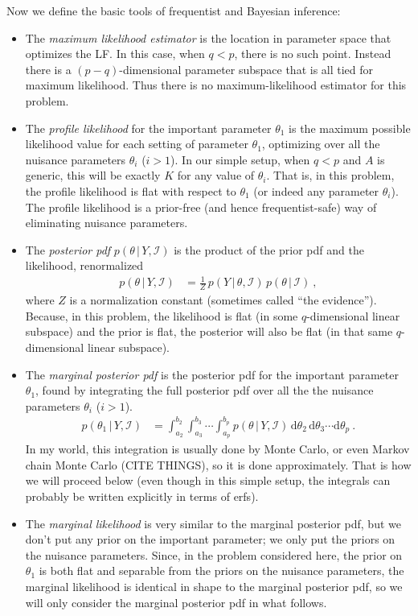 \documentclass[10pt]{article}
\newcommand{\given}{\,|\,}
\newcommand{\dd}{\mathrm{d}}
\begin{document}
Now we define the basic tools of frequentist and Bayesian inference:
\begin{itemize}
\item
The \emph{maximum likelihood estimator} is the location in parameter space that optimizes the LF.
In this case, when $q<p$, there is no such point.
Instead there is a $(p-q)$-dimensional parameter subspace that is all tied for maximum likelihood.
Thus there is no maximum-likelihood estimator for this problem.
\item
The \emph{profile likelihood} for the important parameter $\theta_1$ is the maximum possible likelihood value for each setting of parameter $\theta_1$, optimizing over all the nuisance parameters $\theta_i$ ($i>1$).
In our simple setup, when $q<p$ and $A$ is generic, this will be exactly $K$ for any value of $\theta_i$.
That is, in this problem, the profile likelihood is flat with respect to $\theta_1$ (or indeed any parameter $\theta_i$).
The profile likelihood is a prior-free (and hence frequentist-safe) way of eliminating nuisance parameters.
\item
The \emph{posterior pdf} $p(\theta\given Y,\mathscr{I})$ is the product of the prior pdf and the likelihood, renormalized
\begin{align}
    p(\theta\given Y,\mathscr{I}) &= \frac{1}{Z}\,p(Y\given\theta,\mathscr{I})\,p(\theta\given\mathscr{I}) ~,
\end{align}
where $Z$ is a normalization constant (sometimes called ``the evidence'').
Because, in this problem, the likelihood is flat (in some $q$-dimensional linear subspace) and the prior is flat, the posterior will also be flat (in that same $q$-dimensional linear subspace).
\item
The \emph{marginal posterior pdf} is the posterior pdf for the important parameter $\theta_1$, found by integrating the full posterior pdf over all the the nuisance parameters $\theta_i$ ($i>1$).
\begin{align}
    p(\theta_1\given Y,\mathscr{I}) &= \int_{a_2}^{b_2}\int_{a_3}^{b_3}\cdots\int_{a_p}^{b_p} p(\theta\given Y,\mathscr{I})\,\dd\theta_2\,\dd\theta_3\cdots\dd\theta_p ~.
\end{align}
In my world, this integration is usually done by Monte Carlo, or even Markov chain Monte Carlo (CITE THINGS), so it is done approximately.
That is how we will proceed below (even though in this simple setup, the integrals can probably be written explicitly in terms of erfs).
\item
The \emph{marginal likelihood} is very similar to the marginal posterior pdf, but we don't put any prior on the important parameter; we only put the priors on the nuisance parameters.
Since, in the problem considered here, the prior on $\theta_1$ is both flat and separable from the priors on the nuisance parameters, the marginal likelihood is identical in shape to the marginal posterior pdf, so we will only consider the marginal posterior pdf in what follows.
\end{itemize}
\end{document}
